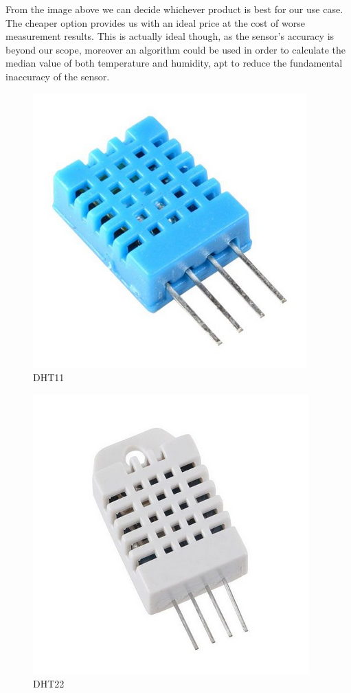 \documentclass[11pt]{article}
\begin{document}
From the image above we can decide whichever product is best for our use case. The cheaper option provides us with an ideal price at the cost of worse measurement results. This is actually ideal though, as the sensor's accuracy is beyond our scope, moreover an algorithm could be used in order to calculate the median value of both temperature and humidity, apt to reduce the fundamental inaccuracy of the sensor. \par
\vspace{0.5 cm}
\begin{figure}[h]
    \centering
    \includegraphics[scale = 0.2]{DHT11.png}
    \caption{DHT11}
    \label{fig:DHT11}
\end{figure}
\begin{figure}[h]
    \centering
    \includegraphics[scale = 0.2]{DHT22.png}
    \caption{DHT22}
    \label{fig:DHT22}
\end{figure}
\vspace{0.5 cm}
\end{document}
